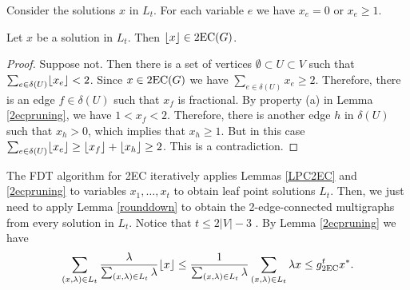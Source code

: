 Consider the solutions $x$ in $L_t$. For each variable $e$ we have $x_e=0$ or $x_e\geq 1$. 
\begin{lemma}\label{rounddown}
	Let $x$ be a solution in $L_t$. Then $\lfloor x\rfloor \in \operatorname{2EC}(G)$. 
\end{lemma}
\begin{proof}
	Suppose not. Then there is a set of vertices $\emptyset \subset U \subset V$ such that $\sum_{e\in \delta(U)}\lfloor x_e\rfloor<2$. Since $x\in \operatorname{2EC}(G)$ we have $\sum_{e\in \delta(U)}x_e \geq 2$. Therefore, there is an edge $f\in \delta(U)$ such that $x_f$ is fractional. By property (a) in Lemma \ref{2ecpruning}, we have $1<  x_f < 2$. Therefore, there is another edge $h$ in $\delta(U)$ such that $x_h>0$, which implies that $x_h\geq 1$. But in this case $\sum_{e\in \delta(U)}\lfloor x_e\rfloor\geq  \lfloor x_f\rfloor+\lfloor x_h\rfloor  \geq 2$. This is a contradiction.
\end{proof}

The FDT algorithm for 2EC iteratively applies Lemmas \ref{LPC2EC} and \ref{2ecpruning} to variables $x_1,\ldots,x_t$ to obtain leaf point solutions $L_t$. Then, we just need to apply Lemma \ref{rounddown} to obtain the 2-edge-connected multigraphs from every solution in $L_t$. Notice that $t\leq 2|V|-3$ \cite{gerard}. By Lemma \ref{2ecpruning} we have
\begin{align*}
\sum_{(x,\lambda)\in L_t} \frac{\lambda}{\sum_{(x,\lambda)\in L_t}\lambda} \lfloor x\rfloor \leq \frac{1}{\sum_{(x,\lambda)\in L_t}\lambda} \sum_{(x,\lambda)\in L_t} \lambda {x} \leq g^t_{\operatorname{2EC}} x^*.
\end{align*}











